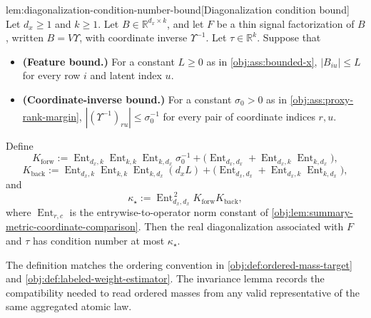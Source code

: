\begin{lemmav}{lem:diagonalization-condition-number-bound}[Diagonalization condition bound]
Let \(d_x\ge 1\) and \(k\ge 1\).  Let \(B\in\mathbb R^{d_x\times k}\), and let \(F\) be a thin signal factorization of \(B\), written \(B=V\Upsilon\), with coordinate inverse \(\Upsilon^{-1}\).  Let \(\tau\in\mathbb R^k\).  Suppose that
\begin{itemize}
\item \textbf{(Feature bound.)} For a constant \(L\ge 0\) as in \cref{obj:ass:bounded-x}, \(|B_{iu}|\le L\) for every row \(i\) and latent index \(u\).
\item \textbf{(Coordinate-inverse bound.)} For a constant \(\sigma_0>0\) as in \cref{obj:ass:proxy-rank-margin}, \(|(\Upsilon^{-1})_{ru}|\le \sigma_0^{-1}\) for every pair of coordinate indices \(r,u\).
\end{itemize}
Define
\[
K_{\mathrm{forw}}
:=
\operatorname{Ent}_{d_x,k}\operatorname{Ent}_{k,k}\operatorname{Ent}_{k,d_x}\sigma_0^{-1}
+
\bigl(\operatorname{Ent}_{d_x,d_x}
+
\operatorname{Ent}_{d_x,k}\operatorname{Ent}_{k,d_x}\bigr),
\]
\[
K_{\mathrm{back}}
:=
\operatorname{Ent}_{d_x,k}\operatorname{Ent}_{k,k}\operatorname{Ent}_{k,d_x}(d_xL)
+
\bigl(\operatorname{Ent}_{d_x,d_x}
+
\operatorname{Ent}_{d_x,k}\operatorname{Ent}_{k,d_x}\bigr),
\]
and
\[
\kappa_\star
:=
\operatorname{Ent}_{d_x,d_x}^{\,2}K_{\mathrm{forw}}K_{\mathrm{back}},
\]
where \(\operatorname{Ent}_{r,c}\) is the entrywise-to-operator norm constant of \cref{obj:lem:summary-metric-coordinate-comparison}.  Then the real diagonalization associated with \(F\) and \(\tau\) has condition number at most \(\kappa_\star\).
\end{lemmav}

The definition matches the ordering convention in \cref{obj:def:ordered-mass-target} and \cref{obj:def:labeled-weight-estimator}. The invariance lemma records the compatibility needed to read ordered masses from any valid representative of the same aggregated atomic law.
